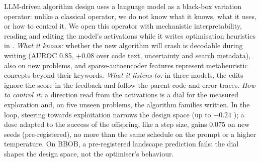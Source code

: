 LLM-driven algorithm design uses a language model as a black-box
variation operator: unlike a classical operator, we do not know what
it knows, what it uses, or how to control it. We open this operator with mechanistic interpretability,
reading and editing the model's activations while it writes optimisation
heuristics in \llamea. \emph{What it knows:} whether the new algorithm
will crash is decodable during writing (AUROC 0.85, +0.08
over code text, uncertainty and search metadata), also on new
problems, and sparse-autoencoder features represent metaheuristic
concepts beyond their keywords. \emph{What it listens to:} in three
models, the edits ignore the score in the feedback and follow the parent
code and error traces. \emph{How to control it:} a direction read from
the activations is a dial for the measured exploration and, on five
unseen problems, the algorithm families written. In the loop, steering towards exploitation narrows the design
space (up to $-0.24$ \aocc); a dose adapted to the success of the
offspring, like a step size, gains 0.075 \aocc on new seeds
(pre-registered), no more than the same schedule on the prompt
or a higher temperature. On BBOB, a pre-registered landscape prediction
fails: the dial shapes the design space, not the optimiser's
behaviour.
